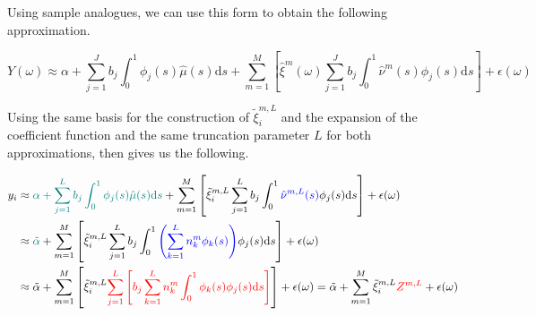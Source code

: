 \documentclass[11pt,twoside,a4paper]{article}
\begin{document}
	Using sample analogues, we can use this form to obtain the following approximation.

	\begin{equation}\label{fpc_exp_transf}
			Y(\omega) \approx \alpha + \sum_{j = 1}^{J} b_j \int_{0}^{1} \phi_j(s) \hat{\mu}(s) \mathrm{d}s +  \sum_{m  = 1}^{M} \left[ \hat{\xi}^m(\omega) \sum_{j = 1}^{J} b_j \int_{0}^{1} \hat{\nu}^m(s) \phi_j(s) \mathrm{d}s \right] + \epsilon(\omega)
	\end{equation}

	Using the same basis for the construction of $\tilde{\xi}^{m,L}_{i}$ and the expansion of the coefficient function and the same truncation parameter $L$ for both approximations, then gives us the following.
	
	\begin{equation}
		\begin{split}
			y_i & \approx {\color{teal}\alpha + \sum_{j = 1}^{L} b_j \int_{0}^{1} \phi_j(s) \hat{\mu}(s) \mathrm{d}s} +  \sum_{m  = 1}^{M} \left[ \tilde{\xi}^{m,L}_{i} \sum_{j = 1}^{L} b_j \int_{0}^{1} {\color{blue}\hat{\nu}^{m,L}(s)} \phi_j(s) \mathrm{d}s \right] + \epsilon(\omega) \\
			& \approx {\color{teal} \tilde{\alpha}} + \sum_{m  = 1}^{M} \left[ \tilde{\xi}^{m,L}_{i} \sum_{j = 1}^{L} b_j \int_{0}^{1}{\color{blue}\left(\sum_{k = 1}^{L} n_{k}^m \phi_{k}(s)\right)} \phi_j(s) \mathrm{d}s \right] + \epsilon(\omega) \\
			& \approx \tilde{\alpha} + \sum_{m  = 1}^{M} \left[ \tilde{\xi}^{m,L}_{i} {\color{red}\sum_{j = 1}^{L} \left[ b_j \sum_{k = 1}^{L} n_{k}^m \int_{0}^{1} \phi_{k}(s) \phi_j(s) \mathrm{d}s \right]} \right]+ \epsilon(\omega)
			= \tilde{\alpha} + \sum_{m  = 1}^{M} \tilde{\xi}^{m,L}_{i} {\color{red}Z^{m,L}}+ \epsilon(\omega)
		\end{split}
	\end{equation}
\end{document}
